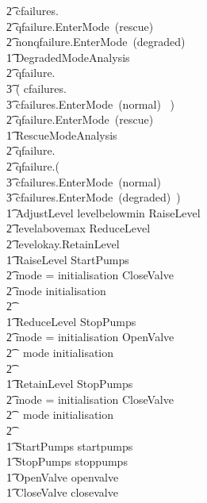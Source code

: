 \documentclass{report} %
\begin{document}
\begin{circus}
            \t2 cfailures.\false \then \Skip \extchoice \\
            \t2 qfailure.\true \then EnterMode~(rescue) \extchoice \\
            \t2 nonqfailure.\true \then EnterMode~(degraded) \\
        \t1 DegradedModeAnalysis \circdef \\
            \t2 qfailure.\false \then \\
                \t3 ( cfailures.\true \then \Skip \extchoice \\
                \t3 cfailures.\false \then EnterMode~(normal) ~) \\
            \t2 \extchoice qfailure.\true \then EnterMode~(rescue) \\
        \t1 RescueModeAnalysis \circdef \\
            \t2 qfailure.\true \then \Skip \extchoice \\
            \t2 qfailure.\false \then ( \\
                \t3 cfailures.\false \then EnterMode~(normal) \\
                \t3 \extchoice cfailures.\true \then EnterMode~(degraded)~) \\
        \t1 AdjustLevel \circdef  levelbelowmin \then RaiseLevel \extchoice \\ %
            \t2 levelabovemax \then ReduceLevel \extchoice  \\ %
            \t2 levelokay.\true \then RetainLevel \\
        \t1 RaiseLevel \circdef StartPumps \circseq\ \\
            \t2 \circif mode = initialisation \circthen CloseValve \\
            \t2 \circelse mode \neq initialisation \circthen \Skip \\
            \t2 \circfi  \\
        \t1 ReduceLevel \circdef StopPumps \circseq\ \\
            \t2 \circif mode = initialisation \circthen OpenValve \\
            \t2\ \ \circelse mode \neq initialisation \circthen \Skip \\
            \t2 \circfi  \\
        \t1 RetainLevel \circdef StopPumps \circseq\ \\
            \t2 \circif mode = initialisation \circthen CloseValve \\
            \t2\ \ \circelse mode \neq initialisation \circthen \Skip \\
            \t2 \circfi  \\
        \t1 StartPumps \circdef startpumps \then \Skip        \\ %
        \t1 StopPumps \circdef stoppumps \then \Skip         \\ %
        \t1 OpenValve \circdef openvalve \then \Skip         \\ %
        \t1 CloseValve \circdef closevalve \then \Skip \\


\end{circus}
\end{document}
